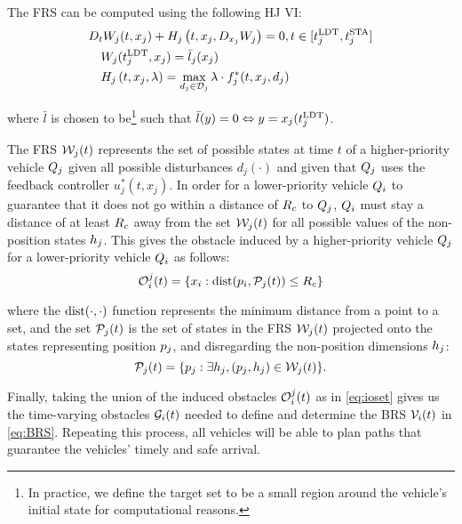 The FRS can be computed using the following HJ VI:
\vspace{-0.4em}
\begin{equation}
\label{eq:FRS_HJIVI}
\begin{aligned}
&D_t W_j(t, x_j) + H_j\left(t, x_j, D_{x_j} W_j\right) = 0, t \in [t^\text{LDT}_j, t^\text{STA}_j]\\
&\quad W_j(t^\text{LDT}_j, x_j) = \bar l_j(x_j) \\
&\quad H_j\left(t, x_j, \lambda\right) = \max_{d_j \in \mathcal{D}_j} \lambda \cdot f^*_j(t, x_j, d_j)
\end{aligned}
\end{equation}

\noindent where $\bar l$ is chosen to be\footnote{In practice, we define the target set to be a small region around the vehicle's initial state for computational reasons.} such that $\bar l (y) = 0 \Leftrightarrow y = x_j(t^\text{LDT}_j)$.

The FRS $\mathcal{W}_j(t)$ represents the set of possible states at time $t$ of a higher-priority vehicle $Q_j$ given all possible disturbances $d_j(\cdot)$ and given that $Q_j$ uses the feedback controller $u_j^*(t, x_j)$. In order for a lower-priority vehicle $Q_i$ to guarantee that it does not go within a distance of $R_c$ to $Q_j$, $Q_i$ must stay a distance of at least $R_c$ away from the set $\mathcal{W}_j(t)$ for all possible values of the non-position states $h_j$. This gives the obstacle induced by a higher-priority vehicle $Q_j$ for a lower-priority vehicle $Q_i$ as follows:
\vspace{-0.4em}
\begin{equation}
\mathcal{O}_i^j(t) = \{x_i: \text{dist}(p_i, \mathcal{P}_j(t)) \le R_c \}
\end{equation}

\noindent where the $\text{dist}(\cdot, \cdot)$ function represents the minimum distance from a point to a set, and the set $\mathcal{P}_j(t)$ is the set of states in the FRS $\mathcal{W}_j(t)$ projected onto the states representing position $p_j$, and disregarding the non-position dimensions $h_j$:
\vspace{-0.4em}
\begin{equation}
\mathcal{P}_j(t) = \{p_j: \exists h_j, (p_j, h_j) \in \mathcal{W}_j(t)\}.
\end{equation}

Finally, taking the union of the induced obstacles $\mathcal{O}_i^j(t)$ as in \eqref{eq:ioset} gives us the time-varying obstacles $\mathcal{G}_i(t)$ needed to define and determine the BRS $\mathcal{V}_i(t)$ in \eqref{eq:BRS}. Repeating this process, all vehicles will be able to plan paths that guarantee the vehicles' timely and safe arrival.
